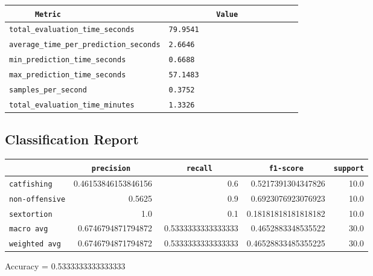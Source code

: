 \documentclass{article}
\begin{document}
\begin{center}
\begin{tabular}{l | l} \hline
    \verb|      Metric     | & \verb|           Value           | \\ \hline
    \hline
    \verb|total_evaluation_time_seconds| & \verb|79.9541                      | \\ \hline
    \verb|average_time_per_prediction_seconds| & \verb|2.6646                       | \\ \hline
    \verb|min_prediction_time_seconds| & \verb|0.6688                       | \\ \hline
    \verb|max_prediction_time_seconds| & \verb|57.1483                      | \\ \hline
    \verb|samples_per_second| & \verb|0.3752                       | \\ \hline
    \verb|total_evaluation_time_minutes| & \verb|1.3326                       | \\ \hline
\end{tabular}
\end{center}

\subsection{Classification Report}

\begin{center}
\begin{tabular}{l | r | r | r | r} \hline
    \verb|            | & \verb|    precision     | & \verb|      recall      | & \verb|     f1-score     | & \verb|support| \\ \hline
    \hline
    \verb|catfishing | & 0.46153846153846156 & 0.6 & 0.5217391304347826 &    10.0 \\ \hline
    \verb|non-offensive| & 0.5625 & 0.9 & 0.6923076923076923 &    10.0 \\ \hline
    \verb|sextortion | & 1.0 & 0.1 & 0.18181818181818182 &    10.0 \\ \hline
    \verb|macro avg  | & 0.6746794871794872 & 0.5333333333333333 & 0.4652883348535522 &    30.0 \\ \hline
    \verb|weighted avg| & 0.6746794871794872 & 0.5333333333333333 & 0.46528833485355225 &    30.0 \\ \hline
\end{tabular}
\end{center}

\begin{center}
Accuracy = 0.5333333333333333
\end{center}
\end{document}
